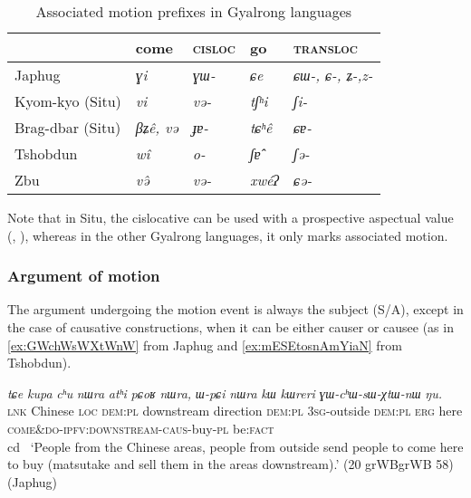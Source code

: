 \documentclass[oneside,a4paper,11pt]{article}
\newcommand{\ipa}[1]{{\phon\textit{#1}}}
\newcommand{\sens}[1]{‘#1’}
\newcommand{\rouge}[1]{{\color{red}#1}}
\begin{document}
\begin{table}[H]
\caption{Associated motion prefixes in Gyalrong languages} \centering \label{tab:am-gyalrong}
\begin{tabular}{lllll}
\toprule
&come & \textsc{cisloc} & go & \textsc{transloc} \\
\midrule
Japhug &  \ipa{ɣi} &\ipa{ɣɯ-} &\ipa{ɕe} &\ipa{ɕɯ-, ɕ-, ʑ-,z- } \\
Kyom-kyo (Situ) &\ipa{vi} &\ipa{və-} &\ipa{tʃʰi} &\ipa{ʃi-} \\
Brag-dbar (Situ) &\ipa{βʑê, və} &\ipa{ɟɐ-} &\ipa{tɕʰê} &\ipa{ɕɐ-} \\
Tshobdun & \ipa{wî}& \ipa{o-} &\ipa{ʃɐ̂} &\ipa{ʃə-} \\
Zbu & \ipa{və̂}& \ipa{və-} &\ipa{xwéʔ} &\ipa{ɕə-} \\
\bottomrule
\end{tabular}
\end{table}

Note that in Situ, the cislocative can be used with a prospective aspectual  value (\citealt{linyj03tense}, \citealt[204]{zhang16bragdbar}), whereas in the other Gyalrong languages, it only marks associated motion.

\subsubsection{Argument of motion}

The argument undergoing the motion event is always the subject (S/A), except in the case of causative constructions, when it can be either causer or causee (as in \ref{ex:GWchWsWXtWnW} from Japhug and \ref{ex:mESEtosnAmYiaN} from Tshobdun).

\begin{exe}
\ex \label{ex:GWchWsWXtWnW}
\gll
\ipa{tɕe} 	\ipa{kupa} 	\ipa{cʰu} 	\ipa{nɯra} 	\ipa{atʰi} 	\ipa{pɕoʁ} 	\ipa{nɯra,} 	\ipa{ɯ-pɕi} 	\ipa{nɯra} 	\ipa{kɯ} 	\ipa{kɯreri} 	\ipa{\rouge{ɣɯ}-cʰɯ-sɯ-χtɯ-nɯ} 	\ipa{ŋu.}  \\
\textsc{lnk} Chinese \textsc{loc} \textsc{dem:pl} downstream direction \textsc{dem:pl} \textsc{3sg}-outside  \textsc{dem:pl}  \textsc{erg} here \textsc{\rouge{come\&do}-ipfv:downstream-caus}-buy-\textsc{pl} be:\textsc{fact} \\cd \
\glt \sens{People from the Chinese areas, people from outside send people to come here to buy (matsutake and sell them in the areas downstream).} (20 grWBgrWB 58) (Japhug)
  \end{exe} 
\end{document}
